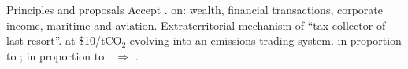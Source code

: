\documentclass[aspectratio=169,xcolor=dvipsnames, 11pt,mathserif]{beamer}
\begin{document}
\begin{frame}{Principles and proposals}
    \bbsp \ip Accept .
    \ip {} on: wealth, financial transactions, corporate income, maritime and aviation.
    \ip Extraterritorial mechanism of ``tax collector of last resort''.
    \ip {} at \$10/tCO$_\text{2}$ evolving into an emissions trading system.
    \ip {} in proportion to ;  in proportion to .
    \ip $\Rightarrow$ . 
    \ee
\end{frame}
\end{document}
